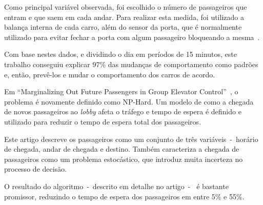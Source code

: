 Como principal variável observada, foi escolhido o número de passageiros que
entram e que saem em cada andar. Para realizar esta medida, foi utilizado a
balança interna de cada carro, além do sensor da porta, que é normalmente
utilizado para evitar fechar a porta com algum passageiro bloqueando a mesma~\cite{marja97}.

Com base nestes dados, e dividindo o dia em períodos de 15 minutos, este
trabalho conseguiu explicar 97\% das mudanças de comportamento como padrões e,
então, prevê-los e mudar o comportamento dos carros de acordo.

Em ``Marginalizing Out Future Passengers in Group Elevator
Control''~\cite{DBLP:journals/corr/abs-1212-2499}, o problema é novamente
definido como NP-Hard. Um modelo de como a chegada de novos passageiros ao
\textit{lobby} afeta o tráfego e tempo de espera é definido e utilizado para
reduzir o tempo de espera total dos passageiros.

Este artigo descreve os passageiros como um conjunto de três variáveis~-~horário
de chegada, andar de chegada e destino. Também caracteriza a chegada de
passageiros como um problema estocástico, que introduz muita incerteza no
processo de decisão.

O resultado do algoritmo~-~descrito em detalhe no artigo~-~ é bastante promissor,
reduzindo o tempo de espera dos passageiros em entre 5\% e 55\%.